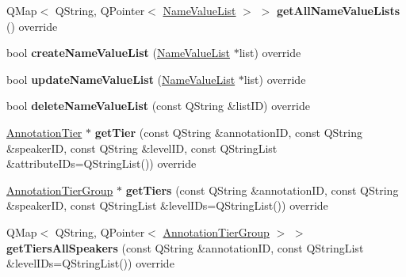 \begin{DoxyCompactItemize}
Q\+Map$<$ Q\+String, Q\+Pointer$<$ \hyperlink{class_name_value_list}{Name\+Value\+List} $>$ $>$ {\bfseries get\+All\+Name\+Value\+Lists} () override
\item 
\mbox{\label{class_x_m_l_annotation_datastore_a6ca59ff632a19d51a5cc500aa7e7d5eb}} 
bool {\bfseries create\+Name\+Value\+List} (\hyperlink{class_name_value_list}{Name\+Value\+List} $\ast$list) override
\item 
\mbox{\label{class_x_m_l_annotation_datastore_a58a58bf3aab906bbe3545a58e3f535cd}} 
bool {\bfseries update\+Name\+Value\+List} (\hyperlink{class_name_value_list}{Name\+Value\+List} $\ast$list) override
\item 
\mbox{\label{class_x_m_l_annotation_datastore_a88f52c2742b7c3a9c0fdb0196b367371}} 
bool {\bfseries delete\+Name\+Value\+List} (const Q\+String \&list\+ID) override
\item 
\mbox{\label{class_x_m_l_annotation_datastore_aa8aa4d73a7051d5540211500db6ec5ff}} 
\hyperlink{class_annotation_tier}{Annotation\+Tier} $\ast$ {\bfseries get\+Tier} (const Q\+String \&annotation\+ID, const Q\+String \&speaker\+ID, const Q\+String \&level\+ID, const Q\+String\+List \&attribute\+I\+Ds=Q\+String\+List()) override
\item 
\mbox{\label{class_x_m_l_annotation_datastore_a8b7c1b9afeffa7362bc4e866f9573cea}} 
\hyperlink{class_annotation_tier_group}{Annotation\+Tier\+Group} $\ast$ {\bfseries get\+Tiers} (const Q\+String \&annotation\+ID, const Q\+String \&speaker\+ID, const Q\+String\+List \&level\+I\+Ds=Q\+String\+List()) override
\item 
\mbox{\label{class_x_m_l_annotation_datastore_a3231129778892d3cdf1a258e3bfc8aa9}} 
Q\+Map$<$ Q\+String, Q\+Pointer$<$ \hyperlink{class_annotation_tier_group}{Annotation\+Tier\+Group} $>$ $>$ {\bfseries get\+Tiers\+All\+Speakers} (const Q\+String \&annotation\+ID, const Q\+String\+List \&level\+I\+Ds=Q\+String\+List()) override
\item 
\mbox{\label{class_x_m_l_annotation_datastore_a96f6c3b21a3f5e3508273217e20660c2}} 

\end{DoxyCompactItemize}
